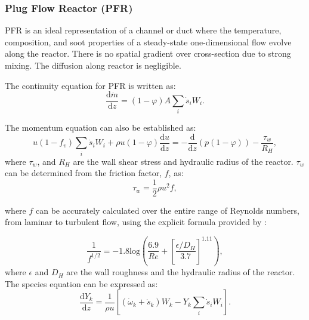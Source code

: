 \subsubsection{Plug Flow Reactor (PFR)}
\label{sec:pfr}
PFR is an ideal representation of a channel or duct where the temperature, composition, and soot properties of a steady-state one-dimensional flow evolve along the reactor. There is no spatial gradient over cross-section due to strong mixing. The diffusion along reactor is negligible.


The continuity equation for PFR is written as:
\begin{equation}
	\frac{\mathrm{d}\dot{m}}{\mathrm{d}z} =(1-\varphi)A \sum_i \dot s_i W_i
	\label{eqn:contpfr}.
\end{equation}

The momentum equation can also be established as:
\begin{equation}
	u (1-f_v) \sum_i \dot s_i W_i + \rho u (1-\varphi) \frac{\mathrm{d}u}{\mathrm{d}z}
	=-\frac{\mathrm{d}}{\mathrm{d}z}(p(1-\varphi))-\frac{\tau_{w}}{R_H} 
	\label{eqn:momenpfr},
\end{equation}
 \noindent where $\tau_w$, and $R_H$ are the wall shear stress and hydraulic radius of the reactor. $\tau_w$ can be determined from the friction factor, $f$, as:
\begin{equation}
	\tau_w = \frac{1}{2}\rho u^2 f, 
	\label{eqn:wallshearpfr}
\end{equation}

\noindent where $f$ can be accurately calculated over the entire range of Reynolds numbers, from laminar to turbulent flow, using the explicit formula provided by \citet{haaland1983simple}:


\begin{equation}
	\frac{1}{f^{1/2}} = -1.8 \mathrm{log}
	\left(
		\frac{6.9}{Re}+
		\left[ \frac{\epsilon/D_H}{3.7} \right]^{1.11}
	\right)
	\label{eqn:fpfr},
\end{equation}
\noindent where $\epsilon$ and ${D_H}$ are the wall roughness and the hydraulic radius of the reactor. The species equation can be expressed as:
\begin{equation}
	\frac{\mathrm{d} Y_k}{\mathrm{d} z}=\frac{1}{\rho u}\left[\left(\dot{\omega}_k+\dot{s}_k\right) W_k-Y_k \sum_i \dot{s}_i W_i\right]
	\label{eqn:speciespfr}.
\end{equation}

